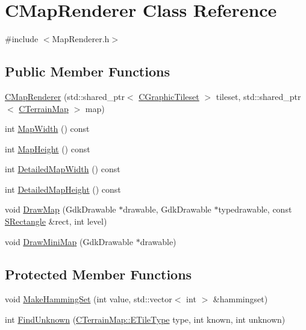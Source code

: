 \hypertarget{classCMapRenderer}{}\section{C\+Map\+Renderer Class Reference}
\label{classCMapRenderer}


{\ttfamily \#include $<$Map\+Renderer.\+h$>$}

\subsection*{Public Member Functions}
\begin{DoxyCompactItemize}
\item 
\hyperlink{classCMapRenderer_a9aca3f780976a94fc6e8873e3cf8e199}{C\+Map\+Renderer} (std\+::shared\+\_\+ptr$<$ \hyperlink{classCGraphicTileset}{C\+Graphic\+Tileset} $>$ tileset, std\+::shared\+\_\+ptr$<$ \hyperlink{classCTerrainMap}{C\+Terrain\+Map} $>$ map)
\item 
int \hyperlink{classCMapRenderer_a4b63ead9be943cbe40b936fa224dc826}{Map\+Width} () const
\item 
int \hyperlink{classCMapRenderer_a68b0c78e7d7d532c14eaf483f4ea3f24}{Map\+Height} () const
\item 
int \hyperlink{classCMapRenderer_a12af1a120fdfa3e80f451ba22fe21a62}{Detailed\+Map\+Width} () const
\item 
int \hyperlink{classCMapRenderer_a08177d52d070532e46538ec65c88277d}{Detailed\+Map\+Height} () const
\item 
void \hyperlink{classCMapRenderer_a26786befd5d6d0b09210736916d1b912}{Draw\+Map} (Gdk\+Drawable $\ast$drawable, Gdk\+Drawable $\ast$typedrawable, const \hyperlink{structSRectangle}{S\+Rectangle} \&rect, int level)
\item 
void \hyperlink{classCMapRenderer_ae5c68b6a4892eb8b9e7a4d8afb4e344e}{Draw\+Mini\+Map} (Gdk\+Drawable $\ast$drawable)
\end{DoxyCompactItemize}
\subsection*{Protected Member Functions}
\begin{DoxyCompactItemize}
\item 
void \hyperlink{classCMapRenderer_a0b06ba89b9a7ad75fa945a3c22dc019a}{Make\+Hamming\+Set} (int value, std\+::vector$<$ int $>$ \&hammingset)
\item 
int \hyperlink{classCMapRenderer_aec3c1d3294ac3af8ebb717ed5be88870}{Find\+Unknown} (\hyperlink{classCTerrainMap_aff2ab991e237269941416dd79d8871d4}{C\+Terrain\+Map\+::\+E\+Tile\+Type} type, int known, int unknown)
\end{DoxyCompactItemize}
